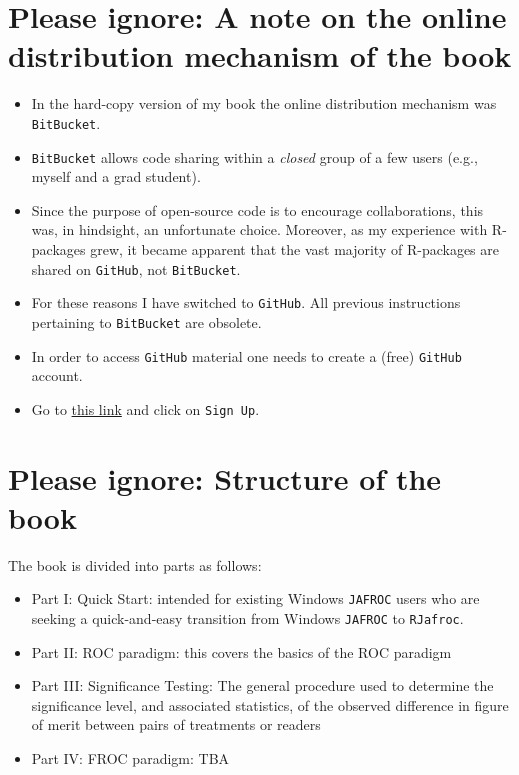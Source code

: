 \documentclass[
]{book}
\providecommand{\tightlist}{%
  \setlength{\itemsep}{0pt}\setlength{\parskip}{0pt}}
\begin{document}
\hypertarget{please-ignore-a-note-on-the-online-distribution-mechanism-of-the-book}{%
\section*{Please ignore: A note on the online distribution mechanism of the book}\label{please-ignore-a-note-on-the-online-distribution-mechanism-of-the-book}}

\begin{itemize}
\tightlist
\item
  In the hard-copy version of my book \citep{chakraborty2017observer} the online distribution mechanism was \texttt{BitBucket}.
\item
  \texttt{BitBucket} allows code sharing within a \emph{closed} group of a few users (e.g., myself and a grad student).
\item
  Since the purpose of open-source code is to encourage collaborations, this was, in hindsight, an unfortunate choice. Moreover, as my experience with R-packages grew, it became apparent that the vast majority of R-packages are shared on \texttt{GitHub}, not \texttt{BitBucket}.
\item
  For these reasons I have switched to \texttt{GitHub}. All previous instructions pertaining to \texttt{BitBucket} are obsolete.
\item
  In order to access \texttt{GitHub} material one needs to create a (free) \texttt{GitHub} account.
\item
  Go to \href{https://github.com}{this link} and click on \texttt{Sign\ Up}.
\end{itemize}

\hypertarget{please-ignore-structure-of-the-book}{%
\section*{Please ignore: Structure of the book}\label{please-ignore-structure-of-the-book}}

The book is divided into parts as follows:

\begin{itemize}
\tightlist
\item
  Part I: Quick Start: intended for existing Windows \texttt{JAFROC} users who are seeking a quick-and-easy transition from Windows \texttt{JAFROC} to \texttt{RJafroc}.
\item
  Part II: ROC paradigm: this covers the basics of the ROC paradigm
\item
  Part III: Significance Testing: The general procedure used to determine the significance level, and associated statistics, of the observed difference in figure of merit between pairs of treatments or readers
\item
  Part IV: FROC paradigm: TBA
\end{itemize}
\end{document}
